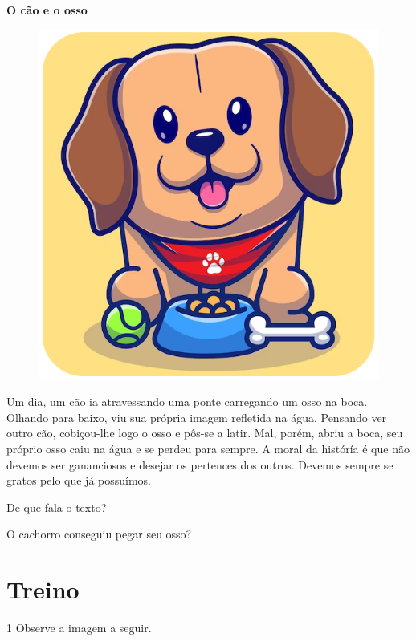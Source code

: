 \begin{myquote}
\textbf{O cão e o osso}

\begin{figure}[H]
\centering
\includegraphics[width=.65\textwidth]{media/image193.png}
\end{figure}

Um dia, um cão ia atravessando uma ponte carregando um osso na boca.
Olhando para baixo, viu sua própria imagem refletida
na água. Pensando ver outro cão, cobiçou-lhe logo o osso e
pôs-se a latir. Mal, porém, abriu a boca, seu próprio osso caiu
na água e se perdeu para sempre.
A moral da históría é que não devemos ser gananciosos e desejar os pertences dos outros. Devemos sempre se gratos pelo que já possuímos. 

\end{myquote}

\begin{escolha}
\item De que fala o texto?


\item O cachorro conseguiu pegar seu osso?

\end{escolha}

\section*{Treino}

\num{1} Observe a imagem a seguir.


